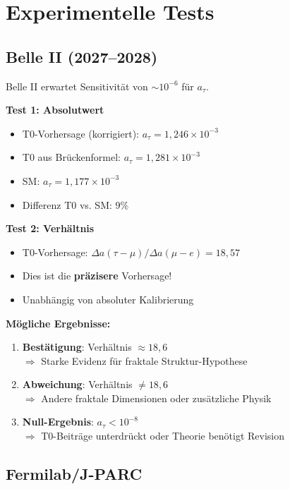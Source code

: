 	\section{Experimentelle Tests}
	
	\subsection{Belle II (2027--2028)}
	
	Belle II erwartet Sensitivität von $\sim 10^{-6}$ für $a_\tau$.
	
	\textbf{Test 1: Absolutwert}
	\begin{itemize}
		\item T0-Vorhersage (korrigiert): $a_\tau = 1{,}246 \times 10^{-3}$
		\item T0 aus Brückenformel: $a_\tau = 1{,}281 \times 10^{-3}$
		\item SM: $a_\tau = 1{,}177 \times 10^{-3}$
		\item Differenz T0 vs. SM: $9\%$
	\end{itemize}
	
	\textbf{Test 2: Verhältnis}
	\begin{itemize}
		\item T0-Vorhersage: $\Delta a(\tau - \mu) / \Delta a(\mu - e) = 18{,}57$
		\item Dies ist die \textbf{präzisere} Vorhersage!
		\item Unabhängig von absoluter Kalibrierung
	\end{itemize}
	
	\textbf{Mögliche Ergebnisse:}
	\begin{enumerate}
		\item \textbf{Bestätigung}: Verhältnis $\approx 18{,}6$ \\
		$\Rightarrow$ Starke Evidenz für fraktale Struktur-Hypothese
		
		\item \textbf{Abweichung}: Verhältnis $\neq 18{,}6$ \\
		$\Rightarrow$ Andere fraktale Dimensionen oder zusätzliche Physik
		
		\item \textbf{Null-Ergebnis}: $a_\tau < 10^{-8}$ \\
		$\Rightarrow$ T0-Beiträge unterdrückt oder Theorie benötigt Revision
	\end{enumerate}
	
	\subsection{Fermilab/J-PARC}
	
